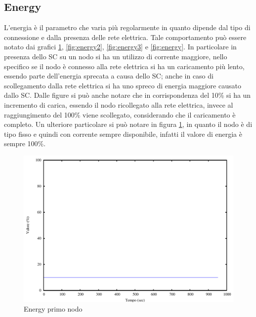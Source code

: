 \subsection{Energy}
L'energia è il parametro che varia più regolarmente in quanto dipende dal tipo di connessione e dalla presenza delle rete elettrica. Tale comportamento può essere notato dai grafici \ref{fig:energy1}, \ref{fig:energy2}, \ref{fig:energy3} e \ref{fig:energy}. In particolare in presenza dello SC su un nodo si ha un utilizzo di corrente maggiore, nello specifico se il nodo è connesso alla rete elettrica si ha un caricamento più lento, essendo parte dell'energia sprecata a causa dello SC; anche in caso di scollegamento dalla rete elettrica si ha uno spreco di energia maggiore causato dallo SC. Dalle figure si può anche notare che in corrispondenza del 10\% si ha un incremento di carica, essendo il nodo ricollegato alla rete elettrica, invece al raggiungimento del 100\% viene scollegato, considerando che il caricamento è completo. Un ulteriore particolare si può notare in figura \ref{fig:energy1}, in quanto il nodo è di tipo fisso e quindi con corrente sempre disponibile, infatti il valore di energia è sempre 100\%.
\begin{figure}[H]
\begin{center}
\includegraphics[scale=0.6]{etc/energy1.pdf}
\caption{Energy primo nodo}
\label{fig:energy1}
\end{center}
\end{figure}
